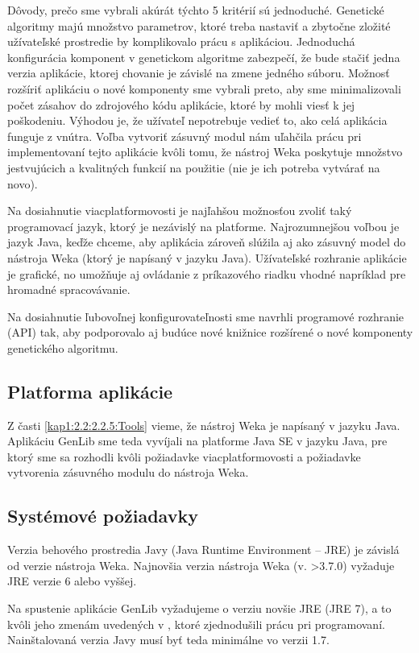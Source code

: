 Dôvody, prečo sme vybrali akúrát týchto 5 kritérií sú jednoduché.
Genetické algoritmy majú množstvo parametrov, ktoré treba nastaviť a zbytočne zložité užívateľské prostredie by komplikovalo prácu s aplikáciou. Jednoduchá konfigurácia komponent v genetickom algoritme zabezpečí, že bude stačiť jedna verzia aplikácie, ktorej chovanie je závislé na zmene jedného súboru. Možnosť rozšíriť aplikáciu o nové komponenty sme vybrali preto, aby sme minimalizovali počet zásahov do zdrojového kódu aplikácie, ktoré by mohli viesť k jej poškodeniu. Výhodou je, že užívateľ nepotrebuje vedieť to, ako celá aplikácia funguje z vnútra. Voľba vytvoriť zásuvný modul nám uľahčila prácu pri implementovaní tejto aplikácie kvôli tomu, že nástroj Weka poskytuje množstvo jestvujúcich a kvalitných funkcií na použitie (nie je ich potreba vytvárať na novo).

Na dosiahnutie viacplatformovosti je najľahšou možnosťou zvoliť taký programovací jazyk, ktorý je nezávislý na platforme.  Najrozumnejšou voľbou je jazyk Java, keďže chceme, aby aplikácia zároveň slúžila aj ako zásuvný model do nástroja Weka (ktorý je napísaný v jazyku Java). Užívateľské rozhranie aplikácie je grafické, no umožňuje aj ovládanie z príkazového riadku vhodné napríklad pre hromadné spracovávanie.

Na dosiahnutie ľubovoľnej konfigurovateľnosti sme navrhli programové rozhranie (API) tak, aby podporovalo aj budúce nové knižnice rozšírené o nové komponenty genetického algoritmu.

\subsection{Platforma aplikácie}\label{kap4:4.1:4.1.2:Environment}
Z časti \ref{kap1:2.2:2.2.5:Tools} vieme, že nástroj Weka je napísaný v jazyku Java.
Aplikáciu GenLib sme teda vyvíjali na platforme Java SE v jazyku Java, pre ktorý sme sa rozhodli kvôli požiadavke viacplatformovosti a požiadavke vytvorenia zásuvného modulu do nástroja Weka.
\subsection{Systémové požiadavky}\label{kap4:4.1:4.1.3:SystemRequirements}
Verzia behového prostredia Javy (Java Runtime Environment -- JRE) je závislá od verzie nástroja Weka. Najnovšia verzia nástroja Weka (v. >3.7.0) vyžaduje JRE verzie 6 alebo vyššej.

Na spustenie aplikácie GenLib vyžadujeme o verziu novšie JRE (JRE 7), a to kvôli jeho zmenám uvedených v \cite{online-java}, ktoré zjednodušili prácu pri programovaní. Nainštalovaná verzia Javy musí byť teda minimálne vo verzii 1.7. 

